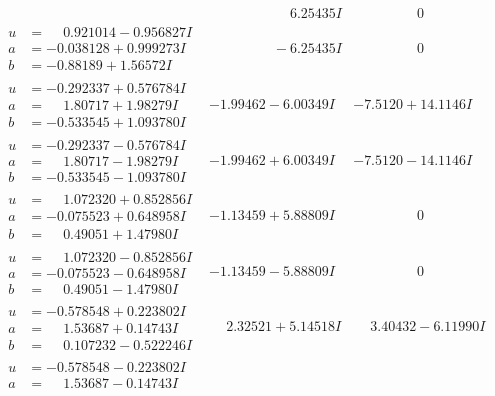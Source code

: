 \documentclass[1p]{elsarticle_modified}
\theoremstyle{definition}
\begin{document}
$$\begin{array}{c|c|c}
 & \phantom{-0.000000 -}6.25435 I & \phantom{-0.000000 } 0 \\ \hline\begin{aligned}
u &= \phantom{-}0.921014 - 0.956827 I \\
a &= -0.038128 + 0.999273 I \\
b &= -0.88189 + 1.56572 I\end{aligned}
 & \phantom{-0.000000 } -6.25435 I & \phantom{-0.000000 } 0 \\ \hline\begin{aligned}
u &= -0.292337 + 0.576784 I \\
a &= \phantom{-}1.80717 + 1.98279 I \\
b &= -0.533545 + 1.093780 I\end{aligned}
 & -1.99462 - 6.00349 I & -7.5120 + 14.1146 I \\ \hline\begin{aligned}
u &= -0.292337 - 0.576784 I \\
a &= \phantom{-}1.80717 - 1.98279 I \\
b &= -0.533545 - 1.093780 I\end{aligned}
 & -1.99462 + 6.00349 I & -7.5120 - 14.1146 I \\ \hline\begin{aligned}
u &= \phantom{-}1.072320 + 0.852856 I \\
a &= -0.075523 + 0.648958 I \\
b &= \phantom{-}0.49051 + 1.47980 I\end{aligned}
 & -1.13459 + 5.88809 I & \phantom{-0.000000 } 0 \\ \hline\begin{aligned}
u &= \phantom{-}1.072320 - 0.852856 I \\
a &= -0.075523 - 0.648958 I \\
b &= \phantom{-}0.49051 - 1.47980 I\end{aligned}
 & -1.13459 - 5.88809 I & \phantom{-0.000000 } 0 \\ \hline\begin{aligned}
u &= -0.578548 + 0.223802 I \\
a &= \phantom{-}1.53687 + 0.14743 I \\
b &= \phantom{-}0.107232 - 0.522246 I\end{aligned}
 & \phantom{-}2.32521 + 5.14518 I & \phantom{-}3.40432 - 6.11990 I \\ \hline\begin{aligned}
u &= -0.578548 - 0.223802 I \\
a &= \phantom{-}1.53687 - 0.14743 I \\

\end{aligned}
\end{array}$$
\end{document}
